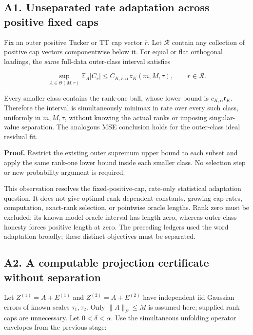 \subsection{A1. Unseparated rate adaptation across positive fixed
caps}\label{a1.-unseparated-rate-adaptation-across-positive-fixed-caps}\label{sup:A1}

Fix an outer positive Tucker or TT cap vector \(\bar r\). Let
\(\mathcal R\) contain any collection of positive cap vectors
componentwise below it. For equal or flat orthogonal loadings, the
\emph{same} full-data outer-class interval satisfies

\[\sup_{A\in\Theta(M,r)}\mathbb E_A|C_{\bar r}|
\le C_{K,\bar r,\alpha}\,\mathfrak r_K(m,M,\tau),\qquad r\in\mathcal R.\]

Every smaller class contains the rank-one ball, whose lower bound is
\(c_{K,\alpha}\mathfrak r_K\). Therefore the interval is simultaneously
minimax in rate over every such class, uniformly in \(m,M,\tau\),
without knowing the actual ranks or imposing singular-value separation.
The analogous MSE conclusion holds for the outer-class ideal residual
fit.

\textbf{Proof.} Restrict the existing outer supremum upper bound to each
subset and apply the same rank-one lower bound inside each smaller
class. No selection step or new probability argument is required.

This observation resolves the fixed-positive-cap, rate-only statistical
adaptation question. It does not give optimal rank-dependent constants,
growing-cap rates, computation, exact-rank selection, or pointwise
oracle lengths. Rank zero must be excluded: its known-model oracle
interval has length zero, whereas outer-class honesty forces positive
length at zero. The preceding ledgers used the word adaptation broadly;
these distinct objectives must be separated.

\subsection{A2. A computable projection certificate without
separation}\label{a2.-a-computable-projection-certificate-without-separation}\label{sup:A2}

Let \(Z^{(1)}=A+E^{(1)}\) and \(Z^{(2)}=A+E^{(2)}\) have independent iid
Gaussian errors of known scales \(\tau_1,\tau_2\). Only \(\|A\|_F\le M\)
is assumed here; supplied rank caps are unnecessary. Let
\(0<\delta<\alpha\). Use the simultaneous unfolding operator envelopes
from the previous stage:


